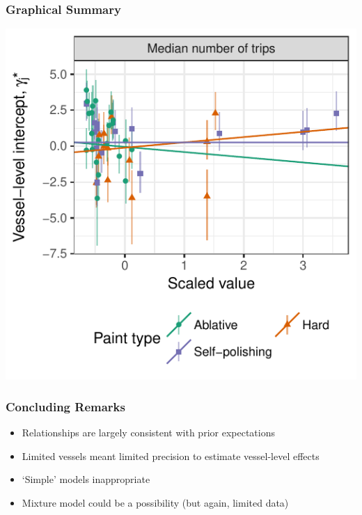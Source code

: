\documentclass[aspectratio=169]{beamer}
\begin{document}
\begin{frame}
  \frametitle{Graphical Summary}
  \centering
  \includegraphics[height=0.8\paperheight]{../graphics/plM3paint-t}
\end{frame}

\begin{frame}
  \frametitle{Concluding Remarks}
  \begin{itemize}
  \item Relationships are largely consistent with prior expectations
  \item Limited vessels meant limited precision to estimate vessel-level effects
  \item `Simple' models inappropriate
  \item Mixture model could be a possibility (but again, limited data)
  \end{itemize}
\end{frame}
\end{document}
